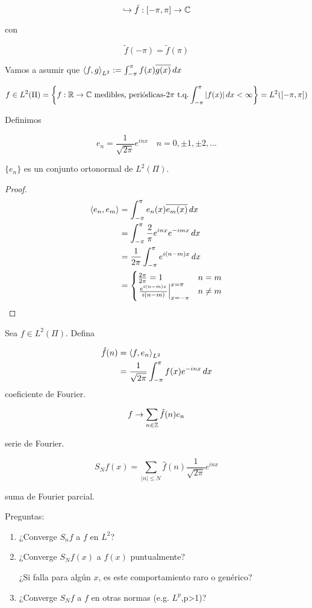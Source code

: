 \[\hookrightarrow \tilde f:[-\pi,\pi]\to\mathbb{C}\]

con

\[\tilde f(-\pi)=\tilde f(\pi)\]

Vamos a asumir que $\left\langle f,g\right\rangle_{L^2}:=\int_{-\pi}^\pi f(x)\overline{g(x)}\,dx$

\[f\in L^2(\Pi)=\left\{f:\mathbb{R}\to\mathbb{C}\text{ medibles, periódicas-$2\pi$ t.q.} \int_{-\pi}^\pi |f(x)|\,dx<\infty\right\}=L^2([-\pi,\pi])\]

Definimos 

\[e_n=\frac{1}{\sqrt{2\pi}}e^{inx}\quad n=0,\pm 1,\pm 2,\ldots\]

\begin{fproposition}
    $\{e_n\}$ es un conjunto ortonormal de $L^2(\Pi)$.
\end{fproposition}

\begin{proof}
    \begin{align*}
        \left\langle e_n,e_m\right\rangle&=\int_{-\pi}^\pi e_n(x)\overline{e_m(x)}\,dx\\
        &=\int_{-\pi}^\pi \frac{2}{\pi} e^{inx}e^{-imx}\,dx\\
        &=\frac{1}{2\pi}\int_{-\pi}^\pi e^{i(n-m)x}\,dx\\
        &=\begin{cases}
            \frac{2\pi}{2\pi}=1&n=m\\
            \left.\frac{e^{i(n-m)x}}{i(n-m)}\right|_{x=-\pi}^{x=\pi}&n\neq m
        \end{cases}
    \end{align*}
\end{proof}

\begin{fdefinition}
    Sea $f\in L^2(\Pi)$. Defina 
    
    \begin{align*}
        \hat f (n)&=\left\langle f,e_n\right\rangle_{L^2}\\
        &=\frac{1}{\sqrt{2\pi}}\int_{-\pi}^\pi f(x) e^{-inx}\,dx
    \end{align*}
    coeficiente de Fourier.

    \[f\to \sum_{n\in\mathbb{Z}}\hat f(n)e_n\]

    serie de Fourier.
\end{fdefinition}

\[S_N f(x)=\sum_{|n|\leq N} \hat f(n)\frac{1}{\sqrt{2\pi}} e^{inx}\]

suma de Fourier parcial.

Preguntas:

\begin{enumerate}
    \item ¿Converge $S_n f$ a $f$ en $L^2$?
    \item ¿Converge $S_N f(x)$ a $f(x)$ puntualmente?
    
    ¿Si falla para algún $x$, es este comportamiento raro o genérico?

    \item ¿Converge $S_N f$ a $f$ en otras normas (e.g. $L^p$,p>1)?
\end{enumerate}